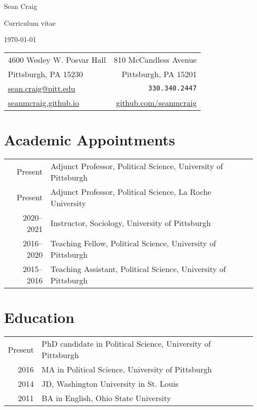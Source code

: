 \documentclass[12pt,letterpaper]{article}
\begin{document}
\begin{center}
  {\Large  Sean Craig} \par
  Curriculum vitae \par
  \today \par
\end{center}

\begin{tabularx}{\textwidth}{@{}XR@{}}
  4600 Wesley W. Posvar Hall & 810 McCandless Avenue \\
  Pittsburgh, PA 15230 & Pittsburgh, PA 15201 \\
  \href{mailto:sean.craig@pitt.edu}{sean.craig@pitt.edu} & {\tt 330.340.2447} \\
  \href{https://seanmcraig.github.io}{seanmcraig.github.io} & \href{https://github.com/seanmcraig}{github.com/seanmcraig}\\
\end{tabularx} \par\bigskip\bigskip

\section*{\sf Academic Appointments}
\begin{tabularx}{\textwidth}{@{}DX@{}}
  Present & Adjunct Professor, Political Science, University of Pittsburgh \\
  Present & Adjunct Professor, Political Science, La Roche University \\
  2020--2021 & Instructor, Sociology, University of Pittsburgh \\
  2016--2020 & Teaching Fellow, Political Science, University of Pittsburgh \\
  2015--2016 & Teaching Assistant, Political Science, University of Pittsburgh \\
\end{tabularx} \par\bigskip\bigskip

\section*{\sf Education}
\begin{tabularx}{\textwidth}{@{}DX@{}}
  Present & PhD candidate in Political Science, University of Pittsburgh \\
  2016 & MA in Political Science, University of Pittsburgh \\
  2014 & JD, Washington University in St. Louis \\
  2011 & BA in English, Ohio State University \\
\end{tabularx} \par\bigskip\bigskip
\end{document}

